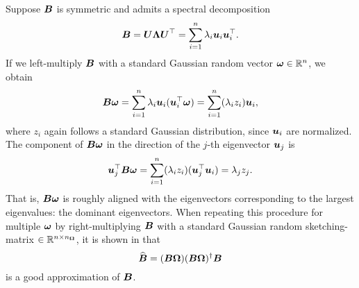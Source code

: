 Suppose $\boldsymbol{B}$ is symmetric and admits a spectral decomposition
\begin{equation}
    \boldsymbol{B}
        = \boldsymbol{U} \boldsymbol{\Lambda} \boldsymbol{U}^{\top} 
        = \sum_{i=1}^n \lambda_i \boldsymbol{u}_i \boldsymbol{u}_i^{\top}.
    \label{equ:3-nystrom-sketching-spectral-decomposition}
\end{equation}
If we left-multiply $\boldsymbol{B}$ with a standard Gaussian random vector $\boldsymbol{\omega} \in \mathbb{R}^n$,
we obtain
\begin{equation}
    \boldsymbol{B}\boldsymbol{\omega}
        = \sum_{i=1}^n \lambda_i \boldsymbol{u}_i (\boldsymbol{u}_i^{\top} \boldsymbol{\omega})
        = \sum_{i=1}^n (\lambda_i  z_i) \boldsymbol{u}_i,
        \label{equ:3-nystrom-sketching-random-multiplication}
\end{equation}
where $z_i$ again follows a standard Gaussian distribution, since $\boldsymbol{u}_i$ are
normalized. The component of $\boldsymbol{B}\boldsymbol{\omega}$ in the direction of the
$j$-th eigenvector $\boldsymbol{u}_j$ is
\begin{equation}
    \boldsymbol{u}_j^{\top}\boldsymbol{B}\boldsymbol{\omega}
        = \sum_{i=1}^n (\lambda_i  z_i) (\boldsymbol{u}_j^{\top} \boldsymbol{u}_i)
        = \lambda_j  z_j.
        \label{equ:3-nystrom-sketching-dominant-component}
\end{equation}
That is, $\boldsymbol{B}\boldsymbol{\omega}$ is roughly aligned with the eigenvectors corresponding
to the largest eigenvalues: the dominant eigenvectors.
When repeating this procedure for multiple $\boldsymbol{\omega}$ by right-multiplying $\boldsymbol{B}$
with a standard Gaussian random \gls{sketching-matrix} $\in \mathbb{R}^{n \times n_{\boldsymbol{\Omega}}}$,
it is shown in \cite{halko2011finding} that
\begin{equation}
    \widehat{\boldsymbol{B}} = (\boldsymbol{B} \boldsymbol{\Omega}) (\boldsymbol{B} \boldsymbol{\Omega})^{\dagger} \boldsymbol{B}
    \label{equ:3-nystrom-RSVD}
\end{equation}
is a good approximation of $\boldsymbol{B}$.\\

